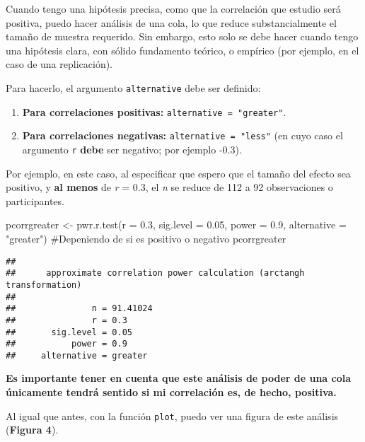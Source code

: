 \documentclass[
]{article}
\newenvironment{Shaded}{\begin{snugshade}}{\end{snugshade}}
\newcommand{\AttributeTok}[1]{\textcolor[rgb]{0.16,0.50,0.73}{#1}}
\newcommand{\CommentTok}[1]{\textcolor[rgb]{0.48,0.49,0.49}{#1}}
\newcommand{\FloatTok}[1]{\textcolor[rgb]{0.96,0.45,0.00}{#1}}
\newcommand{\FunctionTok}[1]{\textcolor[rgb]{0.56,0.27,0.68}{#1}}
\newcommand{\NormalTok}[1]{\textcolor[rgb]{0.81,0.81,0.76}{#1}}
\newcommand{\OtherTok}[1]{\textcolor[rgb]{0.15,0.68,0.38}{#1}}
\newcommand{\StringTok}[1]{\textcolor[rgb]{0.96,0.31,0.31}{#1}}
\providecommand{\tightlist}{%
  \setlength{\itemsep}{0pt}\setlength{\parskip}{0pt}}
\begin{document}
Cuando tengo una hipótesis precisa, como que la correlación que estudio
será positiva, puedo hacer análisis de una cola, lo que reduce
substancialmente el tamaño de muestra requerido. Sin embargo, esto solo
se debe hacer cuando tengo una hipótesis clara, con sólido fundamento
teórico, o empírico (por ejemplo, en el caso de una replicación).

Para hacerlo, el argumento \texttt{alternative} debe ser definido:

\begin{enumerate}
\def\labelenumi{\arabic{enumi}.}
\tightlist
\item
  \textbf{Para correlaciones positivas:}
  \texttt{alternative\ =\ "greater"}.
\item
  \textbf{Para correlaciones negativas:} \texttt{alternative\ =\ "less"}
  (en cuyo caso el argumento \texttt{r} \textbf{debe} ser negativo; por
  ejemplo -0.3).
\end{enumerate}

Por ejemplo, en este caso, al especificar que espero que el tamaño del
efecto sea positivo, y \textbf{al menos} de \emph{r} = 0.3, el \emph{n}
se reduce de 112 a 92 observaciones o participantes.

\begin{Shaded}
\begin{Highlighting}[]
\NormalTok{pcorrgreater }\OtherTok{\textless{}{-}} \FunctionTok{pwr.r.test}\NormalTok{(}\AttributeTok{r =} \FloatTok{0.3}\NormalTok{,}
                     \AttributeTok{sig.level =} \FloatTok{0.05}\NormalTok{,}
                     \AttributeTok{power =} \FloatTok{0.9}\NormalTok{,}
                     \AttributeTok{alternative =} \StringTok{"greater"}\NormalTok{) }\CommentTok{\#Depeniendo de si es positivo o negativo}
\NormalTok{pcorrgreater}
\end{Highlighting}
\end{Shaded}

\begin{verbatim}
## 
##      approximate correlation power calculation (arctangh transformation) 
## 
##               n = 91.41024
##               r = 0.3
##       sig.level = 0.05
##           power = 0.9
##     alternative = greater
\end{verbatim}

\textcolor{red}{\faBookmark} \textbf{Es importante tener en cuenta que
este análisis de poder de una cola únicamente tendrá sentido si mi
correlación es, de hecho, positiva.}

Al igual que antes, con la función \texttt{plot}, puedo ver una figura
de este análisis (\textbf{Figura 4}).
\end{document}
